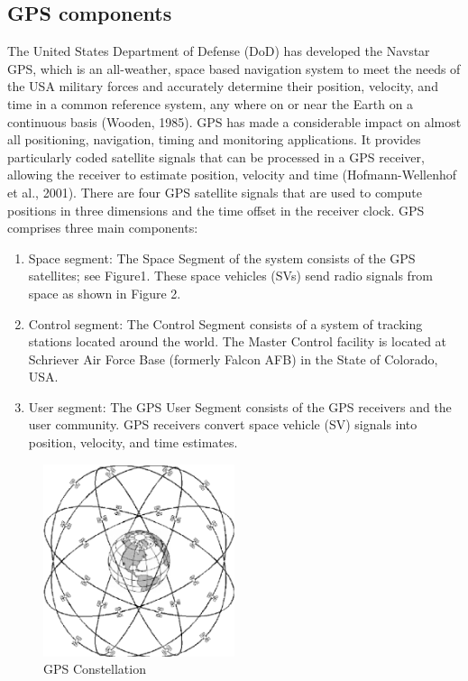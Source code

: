 \subsection{GPS components}
The United States Department of Defense (DoD) has developed the Navstar GPS, which is an
all-weather, space based navigation system to meet the needs of the USA military forces and
accurately determine their position, velocity, and time in a common reference system, any where
on or near the Earth on a continuous basis (Wooden, 1985).
GPS has made a considerable impact on almost all positioning, navigation, timing and
monitoring applications. It provides particularly coded satellite signals that can be processed in a
GPS receiver, allowing the receiver to estimate position, velocity and time (Hofmann-Wellenhof
et al., 2001). There are four GPS satellite signals that are used to compute positions in three
dimensions and the time offset in the receiver clock. GPS comprises three main components:
\begin{enumerate}
	\item Space segment: The Space Segment of the system consists of the GPS satellites;
	 see Figure1. These space vehicles (SVs) send radio signals from space as shown in Figure 2.

	\item Control segment: The Control Segment consists of a system of tracking stations located
	around the world. The Master Control facility is located at Schriever Air Force Base
	(formerly Falcon AFB) in the State of Colorado, USA.

	\item User segment: The GPS User Segment consists of the GPS receivers and the user
	community. GPS receivers convert space vehicle (SV) signals into position, velocity, and
	time estimates.
\end{enumerate}

\begin{figure}[htb] 
	\label{fig:gps_constellation}
	\centering
	\includegraphics[width=0.5\textwidth]{figures/gps_constellation}
	\caption{GPS Constellation}
\end{figure}

